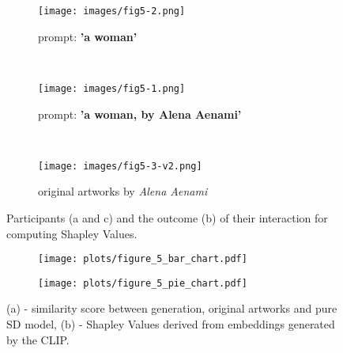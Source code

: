 \documentclass[12pt, letterpaper]{article}
\begin{document}
\begin{figure}[h]
    \centering
    
    \begin{subfigure}{\textwidth}
        \centering
        \texttt{[image: images/fig5-2.png]}
        \caption{prompt: \textbf{'a woman'}}
        \label{fig5:sub1}
    \end{subfigure}
    \\
    
    \begin{subfigure}{\textwidth}
        \centering
        \texttt{[image: images/fig5-1.png]}
        \caption{prompt: \textbf{'a woman, by Alena Aenami'}}
        \label{fig5:sub2}
    \end{subfigure}
    \\

    \begin{subfigure}{\textwidth}
        \centering
        \texttt{[image: images/fig5-3-v2.png]}
        \caption{original artworks by \textit{Alena Aenami}}
        \label{fig5:sub3}
    \end{subfigure}    
    \caption{Participants (a and c) and the outcome (b) of their interaction for computing Shapley Values.}
    \label{fig5:stacked_images}
\end{figure}

\begin{figure}[h]
  \centering
  \begin{subfigure}[b]{0.6\textwidth}
    \texttt{[image: plots/figure\_5\_bar\_chart.pdf]}
    \caption{}
    \label{fig6:image1}
  \end{subfigure}%
  \begin{subfigure}[b]{0.4\textwidth}
    \texttt{[image: plots/figure\_5\_pie\_chart.pdf]}
    \caption{}
    \label{fig6:image2}
  \end{subfigure}
 \captionsetup{justification=centering}
  \caption{(a) - similarity score between generation, original artworks and pure SD model, (b) - Shapley Values derived from embeddings generated by the CLIP.}
  \label{fig6}
\end{figure}
\end{document}
